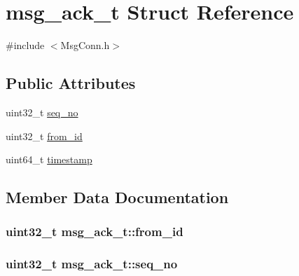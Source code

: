 \hypertarget{structmsg__ack__t}{}\section{msg\+\_\+ack\+\_\+t Struct Reference}
\label{structmsg__ack__t}


{\ttfamily \#include $<$Msg\+Conn.\+h$>$}

\subsection*{Public Attributes}
\begin{DoxyCompactItemize}
\item 
uint32\+\_\+t \hyperlink{structmsg__ack__t_a538ddd46d404c8edded346e37429ef24}{seq\+\_\+no}
\item 
uint32\+\_\+t \hyperlink{structmsg__ack__t_a5cbc2b0862ec72647438f7c46b5b3fc0}{from\+\_\+id}
\item 
uint64\+\_\+t \hyperlink{structmsg__ack__t_a7ed6d2331362b63c760ee04b41fbcc00}{timestamp}
\end{DoxyCompactItemize}


\subsection{Member Data Documentation}
\hypertarget{structmsg__ack__t_a5cbc2b0862ec72647438f7c46b5b3fc0}{}
\subsubsection[{from\+\_\+id}]{\setlength{\rightskip}{0pt plus 5cm}uint32\+\_\+t msg\+\_\+ack\+\_\+t\+::from\+\_\+id}\label{structmsg__ack__t_a5cbc2b0862ec72647438f7c46b5b3fc0}
\hypertarget{structmsg__ack__t_a538ddd46d404c8edded346e37429ef24}{}
\subsubsection[{seq\+\_\+no}]{\setlength{\rightskip}{0pt plus 5cm}uint32\+\_\+t msg\+\_\+ack\+\_\+t\+::seq\+\_\+no}\label{structmsg__ack__t_a538ddd46d404c8edded346e37429ef24}
\hypertarget{structmsg__ack__t_a7ed6d2331362b63c760ee04b41fbcc00}{}
